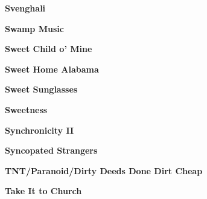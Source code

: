 \vspace{10pt} 
\begin{center}\textbf{Svenghali}\end{center}
\newline
\vspace{10pt} 
\begin{center}\textbf{Swamp Music}\end{center}
\newline
\vspace{10pt} 
\begin{center}\textbf{Sweet Child o' Mine}\end{center}
\newline
\vspace{10pt} 
\begin{center}\textbf{Sweet Home Alabama}\end{center}
\newline
\vspace{10pt} 
\begin{center}\textbf{Sweet Sunglasses}\end{center}
\newline
\vspace{10pt} 
\begin{center}\textbf{Sweetness}\end{center}
\newline
\vspace{10pt} 
\begin{center}\textbf{Synchronicity II}\end{center}
\newline
\vspace{10pt} 
\begin{center}\textbf{Syncopated Strangers}\end{center}
\newline
\vspace{10pt} 
\begin{center}\textbf{TNT/Paranoid/Dirty Deeds Done Dirt Cheap}\end{center}
\newline
\vspace{10pt} 
\begin{center}\textbf{Take It to Church}\end{center}

